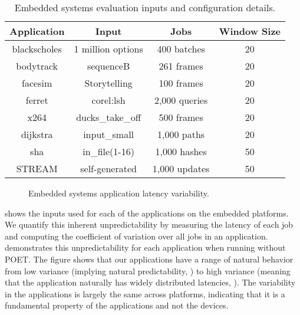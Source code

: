 \begin{table}[t]
\small
\centering
\caption{Embedded systems evaluation inputs and configuration details.}
\begin{tabular}{cccc}
  \textbf{Application} & \textbf{Input} & \textbf{Jobs} & \textbf{Window Size} \\
  \hline
  \hline
  blackscholes   & 1 million options              & 400 batches   & 20 \\
  bodytrack      & sequenceB                      & 261 frames    & 20 \\
  facesim        & Storytelling                   & 100 frames    & 20 \\
  ferret         & corel:lsh                      & 2,000 queries & 20 \\
  x264           & ducks\_take\_off               & 500 frames    & 20 \\
  dijkstra       & input\_small                   & 1,000 paths   & 20 \\
  sha            & in\_file(1-16)                 & 1,000 hashes  & 50 \\
  STREAM         & self-generated                 & 1,000 updates & 50 \\
  \hline
  \hline
\end{tabular}
\label{tbl:poet-embedded-inputs}
\end{table}

\begin{figure}[t]
  \centering
  
  \caption{Embedded systems application latency variability.}
  \label{fig:poet-embedded-variation}
\end{figure}

 shows the inputs used for each of the applications on the embedded platforms.
We quantify this inherent unpredictability by measuring the latency of each job and computing the coefficient of variation over all jobs in an application.
 demonstrates this unpredictability for each application when running without POET.
The figure shows that our applications have a range of natural behavior from low variance (implying natural predictability, \eg {}) to high variance (meaning that the application naturally has widely distributed latencies, \eg {}).
The variability in the applications is largely the same across platforms, indicating that it is a fundamental property of the applications and not the devices.

